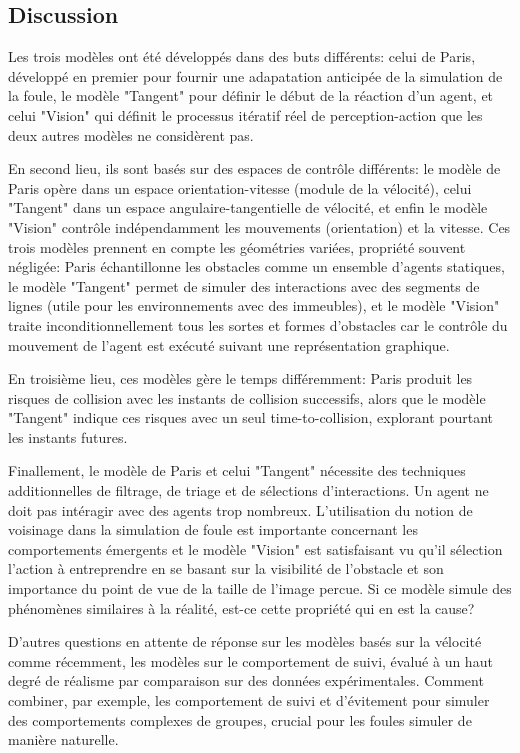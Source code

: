 \documentclass[11pt]{report}
\begin{document}
\subsection{Discussion}

Les trois modèles ont été développés dans des buts différents: celui de Paris, développé en premier pour fournir une adapatation anticipée de la simulation de la foule, le modèle "Tangent" pour définir le début de la réaction d'un agent, et celui "Vision" qui définit le processus itératif réel de perception-action que les deux autres modèles ne considèrent pas.

En second lieu, ils sont basés sur des espaces de contrôle différents: le modèle de Paris opère dans un espace orientation-vitesse (module de la vélocité), celui "Tangent" dans un espace angulaire-tangentielle de vélocité, et enfin le modèle "Vision" contrôle indépendamment les mouvements (orientation) et la vitesse. Ces trois modèles prennent en compte les géométries variées, propriété souvent négligée: Paris échantillonne les obstacles comme un ensemble d'agents statiques, le modèle "Tangent" permet de simuler des interactions avec des segments de lignes (utile pour les environnements avec des immeubles), et le modèle "Vision" traite inconditionnellement tous les sortes et formes d'obstacles car le contrôle du mouvement de l'agent est exécuté suivant une représentation graphique.

En troisième lieu, ces modèles gère le temps différemment: Paris produit les risques de collision avec les instants de collision successifs, alors que le modèle "Tangent" indique ces risques avec un seul time-to-collision, explorant pourtant les instants futures.

Finallement, le modèle de Paris et celui "Tangent" nécessite des techniques additionnelles de filtrage, de triage et de sélections d'interactions. Un agent ne doit pas intéragir avec des agents trop nombreux. L'utilisation du notion de voisinage dans la simulation de foule est importante concernant les comportements émergents et le modèle "Vision" est satisfaisant vu qu'il sélection l'action à entreprendre en se basant sur la visibilité de l'obstacle et son importance du point de vue de la taille de l'image percue. Si ce modèle simule des phénomènes similaires à la réalité, est-ce cette propriété qui en est la cause?

D'autres questions en attente de réponse sur les modèles basés sur la vélocité comme récemment, les modèles sur le comportement de suivi, évalué à un haut degré de réalisme par comparaison sur des données expérimentales. Comment combiner, par exemple, les comportement de suivi et d'évitement pour simuler des comportements complexes de groupes, crucial pour les foules simuler de manière naturelle.
\end{document}
